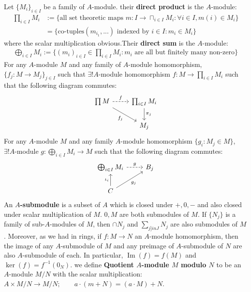 \documentclass[12pt]{article}
\theoremstyle{definition}
\theoremstyle{plain}
\DeclareMathOperator{\im}{Im}
\begin{document}
\Def Let $\{M_i\}_{i\in I}$ be a family of $A$-module. their \textbf{direct product} is the $A$-module:
\begin{align*}
  \prod_{i\in I}M_i&:=\{\text{all set theoretic maps }m:I\to \sqcap_{i\in I}M_i: \forall i\in I, m(i)\in M_i\}
  \\ &=\{\text{co-tuples}(m_{i_1}, ...) \text{ indexed by }i\in I: m_i\in M_i\}
\end{align*}
where the scalar multiplication obvious.Their \textbf{direct sum} is the $A$-module:
\begin{align*}
  \bigoplus_{i\in I}M_i:=\{(m_i)_{i\in I}\in \prod_{i\in I}M_i: m_i \text{ are all but finitely many non-zero}\}
\end{align*}
 For any $A$-module $M$ and any family of $A$-module homomorphism, $\{f_j:M\to M_j\}_{j\in I}$ such that $\exists !A$-module homomorphism $f:M\to \prod_{i\in I}M_i$ such that the following diagram commutes:
\begin{equation}\begin{tikzcd}
\prod M\ar[dashed]{r}{f} \ar{rd}[swap]{f_j}&\prod_{i\in I}M_i\ar{d}[two heads]{\pi_j}\\
& M_j
\end{tikzcd}
\end{equation}
 For any $A$-module $M$ and any family $A$-module homomorphism $\{g_i: M_j\in M\}$, $\exists ! A$-module $g:\bigoplus_{i\in I}M_i\to M$ such that the following diagram commutes:
\begin{equation}\begin{tikzcd}
\bigoplus_{i\in I}M_i\ar[dashed]{r}{g} &B_j\\
C\arrow{u}{\iota_i} \ar{ru}[swap]{g_j}
\end{tikzcd}
\end{equation}
\Def An \textbf{$A$-submodule} is a subset of $A$ which is closed under $+, 0, -$ and also closed under scalar multiplication of $M$.
\Exe $0, M$ are both submodules of $M$. If $\{N_j\}$ is a family of sub-$A$-modules of $M$, then $\cap N_j$ and $\sum_{j]in J}N_j$ are also submodules of $M$. Moreover, as we had in rings, if $f:M\to N$ an $A$-module homomorphism, then the image of any $A$-submodule of $M$ and any preimage of $A$-submodule of $N$ are also $A$-submodule of each. In particular, $\im(f)=f(M)$ and $\ker(f)=f^{-1}(0_N)$.
\Def we define \textbf{Quotient $A$-module $M$ modulo $N$} to be an $A$-module $M/N$ with the scalar multiplication: $A\times M/N \to M/N;\qquad  a\cdot (m+N)=(a\cdot M)+N$.
\end{document}
